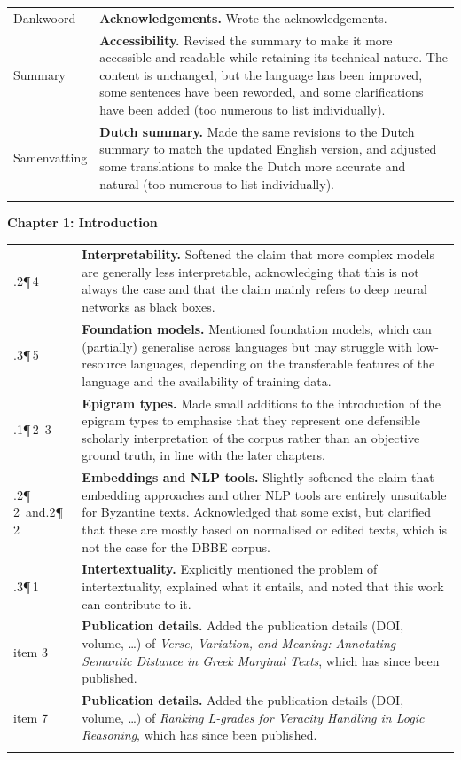 \documentclass[11pt,a4paper]{article}
\makeatletter
\newcommand{\heading}[1]{%
  \par\addvspace{1.5em}%
  {\raggedright\large\bfseries #1\par}\nopagebreak[4]%
  \vspace{0.2em}\nopagebreak[4]%
}
\newlength{\loccol}
\newenvironment{changes}{%
  \begin{tabular}{@{}>{\raggedright\arraybackslash}p{\loccol}
                     >{\raggedright\arraybackslash}p{\dimexpr\textwidth-\loccol-2\tabcolsep\relax}@{}}
    \toprule
}{%
    \bottomrule
  \end{tabular}\par
}
\newcommand{\change}[2]{#1 & #2 \\ \addlinespace[0.45em]}
\newcommand{\loc}[2]{#1\enspace #2}
\newcommand{\topic}[1]{\textbf{#1.}}
\makeatother
\begin{document}
\begin{changes}
  \change{\loc{Dankwoord}{}}{\topic{Acknowledgements} Wrote the acknowledgements.}
  \change{\loc{Summary}{}}{\topic{Accessibility} Revised the summary to make it more accessible and readable while retaining its technical nature. The content is unchanged, but the language has been improved, some sentences have been reworded, and some clarifications have been added (too numerous to list individually).}
  \change{\loc{Samenvatting}{}}{\topic{Dutch summary} Made the same revisions to the Dutch summary to match the updated English version, and adjusted some translations to make the Dutch more accurate and natural (too numerous to list individually).}
\end{changes}

\heading{Chapter 1: Introduction}

\begin{changes}
  \change{\loc{1.2.2}{¶\,4}}{\topic{Interpretability} Softened the claim that more complex models are generally less interpretable, acknowledging that this is not always the case and that the claim mainly refers to deep neural networks as black boxes.}
  \change{\loc{1.2.3}{¶\,5}}{\topic{Foundation models} Mentioned foundation models, which can (partially) generalise across languages but may struggle with low-resource languages, depending on the transferable features of the language and the availability of training data.}
  \change{\loc{1.3.1}{¶\,2--3}}{\topic{Epigram types} Made small additions to the introduction of the epigram types to emphasise that they represent one defensible scholarly interpretation of the corpus rather than an objective ground truth, in line with the later chapters.}
  \change{\loc{1.3.2}{¶\,2}\ and\newline\loc{1.4.2}{¶\,2}}{\topic{Embeddings and NLP tools} Slightly softened the claim that embedding approaches and other NLP tools are entirely unsuitable for Byzantine texts. Acknowledged that some exist, but clarified that these are mostly based on normalised or edited texts, which is not the case for the DBBE corpus.}
  \change{\loc{1.3.3}{¶\,1}}{\topic{Intertextuality} Explicitly mentioned the problem of intertextuality, explained what it entails, and noted that this work can contribute to it.}
  \change{\loc{1.6}{item 3}}{\topic{Publication details} Added the publication details (DOI, volume, \dots) of \textit{Verse, Variation, and Meaning: Annotating Semantic Distance in Greek Marginal Texts}, which has since been published.}
  \change{\loc{1.6}{item 7}}{\topic{Publication details} Added the publication details (DOI, volume, \dots) of \textit{Ranking L-grades for Veracity Handling in Logic Reasoning}, which has since been published.}
\end{changes}
\end{document}
